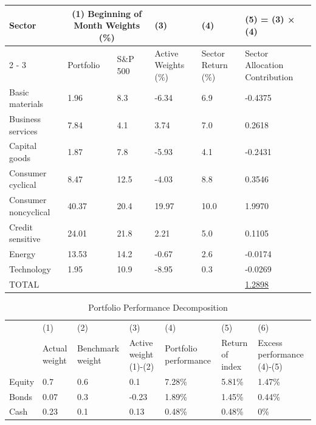 \begin{itemize}
\begin{table}[h]
\begin{tabular}{@{}l*{5}{p{3cm}@{}}}
        \toprule
        \multirow{2}{*}{Sector} & \multicolumn{2}{c}{(1) \newline Beginning of Month Weights (\%)} & (3) & (4) & (5) = (3) × (4) \\
        \cmidrule(lr){2 - 3}
        & Portfolio & S\&P 500 & Active Weights (\%) & Sector Return (\%) & Sector Allocation Contribution \\
        \midrule
        Basic materials & 1.96 & 8.3 & -6.34 & 6.9 & -0.4375 \\
        Business services & 7.84 & 4.1 & 3.74 & 7.0 & 0.2618 \\
        Capital goods & 1.87 & 7.8 & -5.93 & 4.1 & -0.2431 \\
        Consumer cyclical & 8.47 & 12.5 & -4.03 & 8.8 & 0.3546 \\
        Consumer noncyclical & 40.37 & 20.4 & 19.97 & 10.0 & 1.9970 \\
        Credit sensitive & 24.01 & 21.8 & 2.21 & 5.0 & 0.1105 \\
        Energy & 13.53 & 14.2 & -0.67 & 2.6 & -0.0174 \\
        Technology & 1.95 & 10.9 & -8.95 & 0.3 & -0.0269 \\
        \midrule
        TOTAL &  &  &  &  & \underline{1.2898} \\
        \bottomrule
    \end{tabular}
\end{table}

\begin{table}[h]
    \centering
    \caption{Portfolio Performance Decomposition}
    \begin{tabular}{@{}l*{6}{p{2.5cm}@{}}} %
        \toprule
         & (1) & (2) & (3) & (4) & (5) & (6) \\
         & Actual weight & Benchmark weight & Active weight (1)-(2) & Portfolio performance & Return of index & Excess performance (4)-(5) \\
        \midrule
        Equity & 0.7 & 0.6 & 0.1 & 7.28\% & 5.81\% & 1.47\% \\
        Bonds & 0.07 & 0.3 & -0.23 & 1.89\% & 1.45\% & 0.44\% \\
        Cash & 0.23 & 0.1 & 0.13 & 0.48\% & 0.48\% & 0\% \\
        \midrule


\end{tabular}
\end{table}
\end{itemize}
